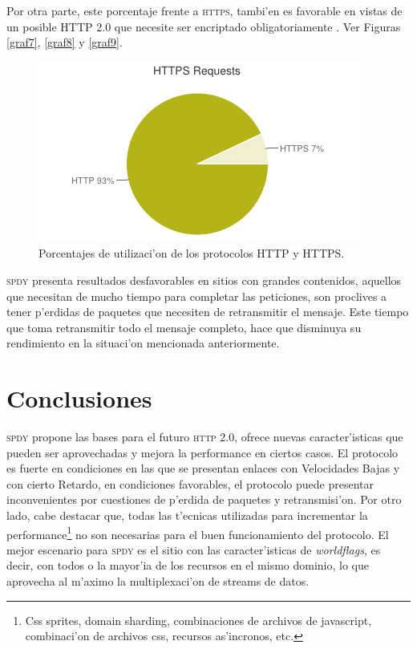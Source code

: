 \documentclass[a4paper,11pt,twocolumn]{article}
\begin{document}
Por otra parte, este porcentaje frente a \textsc{https}, tambi'en es favorable en vistas de un posible HTTP 2.0 \cite{http2} que necesite ser encriptado obligatoriamente \cite{art1http2} \cite{art2http2} \cite{art3http2}. Ver Figuras \ref{graf7}, \ref{graf8} y \ref{graf9}.

\begin{figure}[h]
  	\centering
	\includegraphics[scale=0.53]{httpvshttps}
	\caption{\small Porcentajes de utilizaci'on de los protocolos HTTP y HTTPS.}
	\label{httpvsthhps}
\end{figure}

\textsc{spdy} presenta resultados desfavorables en sitios con grandes contenidos, aquellos que necesitan de mucho tiempo para completar las peticiones, son proclives a tener p'erdidas de paquetes que necesiten de retransmitir el mensaje. Este tiempo que toma retransmitir todo el mensaje completo, hace que disminuya su rendimiento en la situaci'on mencionada anteriormente.

\section{Conclusiones}

\textsc{spdy} propone las bases para el futuro \textsc{http 2.0}, ofrece nuevas caracter'isticas que pueden ser aprovechadas y mejora la performance en ciertos casos. El protocolo es fuerte en condiciones en las que se presentan enlaces con Velocidades Bajas y con cierto Retardo, en condiciones favorables, el protocolo puede presentar inconvenientes por cuestiones de p'erdida de paquetes y retransmisi'on. Por otro lado, cabe destacar que, todas las t'ecnicas utilizadas para incrementar la performance\footnote{Css sprites, domain sharding, combinaciones de archivos de javascript, combinaci'on de archivos css, recursos as'incronos, etc.} no son necesarias para el buen funcionamiento del protocolo. El mejor escenario para \textsc{spdy} es el sitio con las caracter'isticas de \emph{worldflags}, es decir, con todos o la mayor'ia de los recursos en el mismo dominio, lo que aprovecha al m'aximo la multiplexaci'on de streams de datos.
\end{document}
